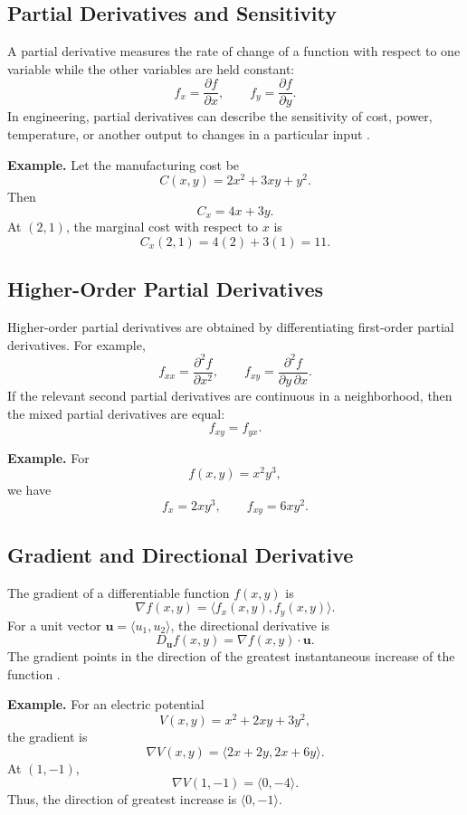 \documentclass[a4paper,12pt]{article}
\theoremstyle{mystyle}
\numberwithin{equation}{section}
\numberwithin{theorem}{section}
\numberwithin{proposition}{section}
\numberwithin{example}{section}
\numberwithin{remark}{section}
\numberwithin{lemma}{section}
\numberwithin{corollary}{section}
\numberwithin{definition}{section}
\begin{document}
\subsection{Partial Derivatives and Sensitivity}

A partial derivative measures the rate of change of a function with
respect to one variable while the other variables are held constant:
\[
f_x=\frac{\partial f}{\partial x},
\qquad
f_y=\frac{\partial f}{\partial y}.
\]
In engineering, partial derivatives can describe the sensitivity
of cost, power, temperature, or another output to changes in a
particular input \cite{openstaxpartial}.

\textbf{Example.}
Let the manufacturing cost be
\[
C(x,y)=2x^2+3xy+y^2.
\]
Then
\[
C_x=4x+3y.
\]
At \((2,1)\), the marginal cost with respect to \(x\) is
\[
C_x(2,1)=4(2)+3(1)=11.
\]

\subsection{Higher-Order Partial Derivatives}

Higher-order partial derivatives are obtained by differentiating
first-order partial derivatives. For example,
\[
f_{xx}=\frac{\partial^2 f}{\partial x^2},
\qquad
f_{xy}=\frac{\partial^2 f}{\partial y\,\partial x}.
\]
If the relevant second partial derivatives are continuous in a
neighborhood, then the mixed partial derivatives are equal:
\[
f_{xy}=f_{yx}.
\]

\textbf{Example.}
For
\[
f(x,y)=x^2y^3,
\]
we have
\[
f_x=2xy^3,\qquad f_{xy}=6xy^2.
\]

\subsection{Gradient and Directional Derivative}

The gradient of a differentiable function \(f(x,y)\) is
\[
\nabla f(x,y)=\langle f_x(x,y),f_y(x,y)\rangle.
\]
For a unit vector \(\mathbf{u}=\langle u_1,u_2\rangle\), the
directional derivative is
\[
D_{\mathbf{u}}f(x,y)=\nabla f(x,y)\cdot\mathbf{u}.
\]
The gradient points in the direction of the greatest instantaneous
increase of the function \cite{openstaxgradient}.

\textbf{Example.}
For an electric potential
\[
V(x,y)=x^2+2xy+3y^2,
\]
the gradient is
\[
\nabla V(x,y)=\langle 2x+2y,2x+6y\rangle.
\]
At \((1,-1)\),
\[
\nabla V(1,-1)=\langle 0,-4\rangle.
\]
Thus, the direction of greatest increase is
\(\langle 0,-1\rangle\).
\end{document}

